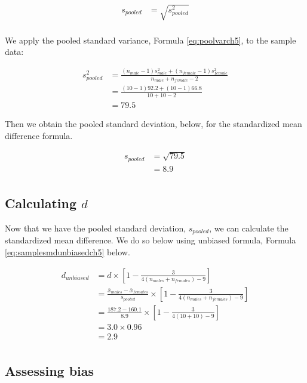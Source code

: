 \documentclass[
]{krantz}
\begin{document}
\[
\begin{aligned} 
s_{pooled}  &= \sqrt{s_{pooled}^2} \\
\end{aligned} 
\]

We apply the pooled standard variance, Formula \eqref{eq:poolvarch5}, to the sample data:

\[
\begin{aligned}
s_{pooled}^2 &= \frac{(n_{male} -1)s_{male}^2 + (n_{female} -1)s_{female}^2}{n_{male} + n_{female}-2} \\
&= \frac{(10 -1)92.2 + (10 -1)66.8}{10 + 10 -2} \\
&= 79.5
\end{aligned}
\]

Then we obtain the pooled standard deviation, below, for the standardized mean difference formula.

\[
\begin{aligned} 
s_{pooled}  &= \sqrt{79.5} \\
&= 8.9\\
\end{aligned} 
\]

\hypertarget{calculating-d}{%
\subsection{\texorpdfstring{Calculating \(d\)}{Calculating d}}\label{calculating-d}}

Now that we have the pooled standard deviation, \(s_{pooled}\), we can calculate the standardized mean difference. We do so below using unbiased formula, Formula \eqref{eq:samplesmdunbiasedch5} below.

\[
\begin{aligned}
d_{unbiased}  &= d \times [1 - \frac{3}{4(n_{males} + n_{females})-9}] \\
&= \frac{\bar{x}_{males} - \bar{x}_{females}}{s_{pooled}} \times [1 - \frac{3}{4(n_{males} + n_{females})-9}] \\
&= \frac{187.2 - 160.1}{8.9} \times [1 - \frac{3}{4(10 + 10)-9}] \\
&= 3.0 \times 0.96\\
&= 2.9\\
\end{aligned}
\]

\hypertarget{assessing-bias}{%
\subsection{Assessing bias}\label{assessing-bias}}
\end{document}
